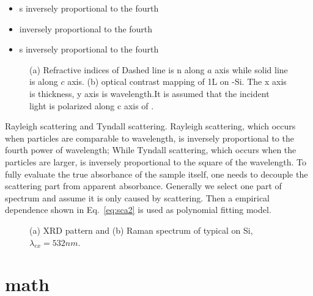 \documentclass[12pt,oneside]{book}
\begin{document}
\begin{itemize}
\item s inversely proportional to the fourth
\item  inversely proportional to the fourth
\item s inversely proportional to the fourth
\end{itemize}

\begin{figure}[htb]
\centering
{}%
\caption[Refractive indices of ]{(a) Refractive indices of  Dashed line is n along $a$ axis while solid line is along $c$ axis. (b) optical contrast mapping of 1L  on -Si. The x axis is  thickness, y axis is wavelength.It is assumed that the incident light is polarized along c axis of .}
\label{fig:mofl}
\end{figure}

Rayleigh scattering and Tyndall scattering. Rayleigh scattering, which occurs when particles are comparable to wavelength, is inversely proportional to the fourth power of wavelength; While Tyndall scattering, which occurs when the particles are larger, is inversely proportional to the square of the wavelength. To fully evaluate the true absorbance of the sample itself, one needs to decouple the scattering part from apparent absorbance. Generally we select one part of spectrum and assume it is only caused by scattering. Then a empirical dependence shown in Eq.~\ref{eq:sca2} is used as polynomial fitting model.
\begin{figure}[htb]
\centering
{}%
\caption[Crystalline phase characterization of  on Si]{(a) XRD pattern and (b) Raman spectrum of typical  on Si, $\lambda_{ex} = 532nm$.}
\label{fig:mooxch}
\end{figure}

    \appendix
    \chapter{math}
    \renewcommand{\bibname}{REFERENCES}
    \begin{singlespace}
    \printbibliography
    \end{singlespace}
\end{document}
